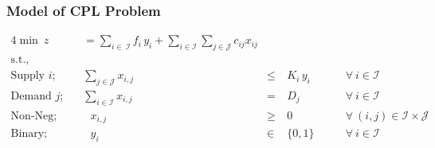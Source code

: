 \documentclass[10pt,handout,notes=show]{beamer}
\begin{document}
\begin{frame}
  \frametitle{Model of CPL Problem }

  \begin{alignat*}{4}
    \min\ z &= \sum_{i \in\ \mathcal{I}} f_i \, y_{i} + \sum_{i \in \mathcal{I}} \sum_{j \in \mathcal{J}} c_{ij} x_{ij} \\
    \mbox{s.t.,}\\
    \mbox{Supply $i$;~~~}& \sum_{j \in \mathcal{J}} x_{i,j} & \leq\ & K_i \, y_i & \qquad \forall\ i \in \mathcal{I} \\
    \mbox{Demand $j$;~~~}& \sum_{i \in \mathcal{I}} x_{i,j} ~~& =\ & D_j & \qquad \forall\ i \in \mathcal{I} \\
    \mbox{Non-Neg;~~~}& ~~~x_{i,j} &\geq\ & 0 & \qquad \forall\ (i,j) \in \mathcal{I} \times \mathcal{J} \\
    \mbox{Binary;~~~}&  ~~~y_{i} &\in\ & \{0,1\} & \qquad \forall\ i \in \mathcal{I} \\
  \end{alignat*}

\end{frame}

\end{document}

